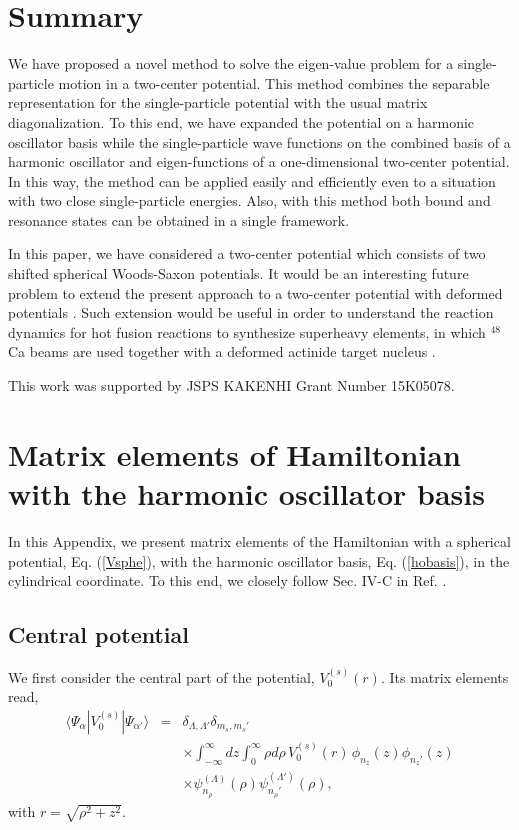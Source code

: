 \documentclass[superscriptaddress,twocolumn,amsmath,amssymb]{revtex4}
\begin{document}
\section{Summary}

We have proposed a novel method to solve the eigen-value 
problem for a single-particle motion in a two-center potential. 
This method combines the separable representation for the single-particle 
potential with the usual matrix diagonalization. 
To this end, we have expanded the potential on a harmonic oscillator 
basis while the single-particle wave functions on the combined basis 
of a harmonic oscillator and eigen-functions of a one-dimensional 
two-center potential. 
In this way, the method can be applied easily and efficiently even 
to a situation with two 
close single-particle energies. Also, with this method both 
bound and resonance states 
can be obtained in a single framework. 

In this paper, we have considered a two-center potential which consists of 
two shifted spherical Woods-Saxon 
potentials. It would be an interesting future 
problem to 
extend the present approach to a two-center potential with deformed 
potentials \cite{NSP87,Diaz-Torres08}. Such extension would 
be useful in order to understand the reaction dynamics for hot fusion reactions 
to synthesize superheavy elements, in which $^{48}$Ca beams are used 
together with a deformed actinide target nucleus \cite{OU15,HHO13}. 

\acknowledgments

This work was supported by JSPS KAKENHI Grant Number 
15K05078. 

\appendix

\section{Matrix elements of Hamiltonian with the harmonic oscillator basis}

In this Appendix, we present matrix elements of the Hamiltonian 
with a spherical potential, Eq. (\ref{Vsphe}), with the harmonic oscillator 
basis, Eq. (\ref{hobasis}), in the cylindrical coordinate. 
To this end, we closely follow Sec. IV-C in Ref. \cite{Vautherin73}. 

\subsection{Central potential}

We first consider the central part of the potential, 
$V_0^{(s)}(r)$. 
Its matrix elements read, 
%
\begin{eqnarray}
\langle \Psi_\alpha|V_0^{(s)}|\Psi_{\alpha'}\rangle 
&=& \delta_{\Lambda,\Lambda'}\delta_{m_s,m_s'} \nonumber \\
&&\times\int^\infty_{-\infty}dz \int^{\infty}_0\rho d\rho\,
V_0^{(s)}(r)\,
\phi_{n_z}(z)\phi_{n_z'}(z) \nonumber \\
&&\times \psi_{n_\rho}^{(\Lambda)}(\rho)\psi_{n_\rho'}^{(\Lambda')}(\rho),
\end{eqnarray}
%
with $r=\sqrt{\rho^2+z^2}$. 
\end{document}
